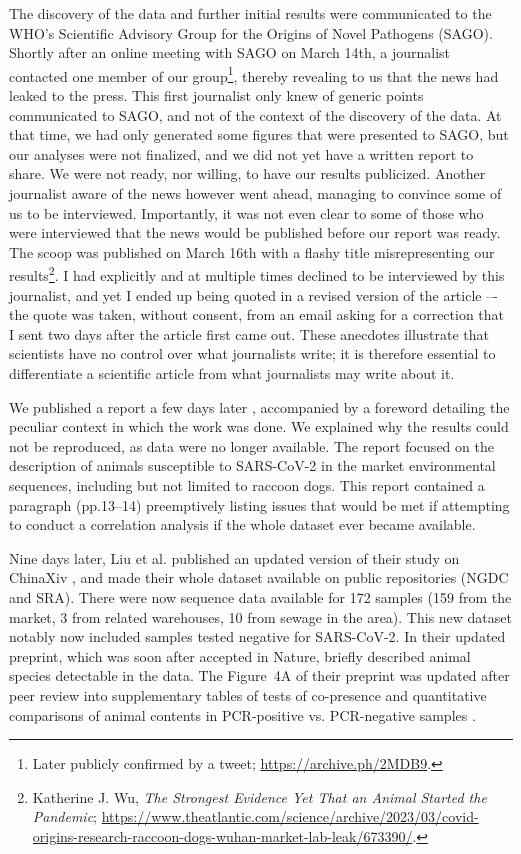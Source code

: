 \documentclass[11pt]{article}
\def \sct {\mbox{SARS-CoV-2}}
\begin{document}
The discovery of the data and further initial results were communicated to the WHO's Scientific Advisory Group for the Origins of Novel Pathogens (SAGO). Shortly after an online meeting with SAGO on March 14th, a journalist contacted one member of our group\footnote{Later publicly confirmed by a tweet; \url{https://archive.ph/2MDB9}.}, thereby revealing to us that the news had leaked to the press. This first journalist only knew of generic points communicated to SAGO, and not of the context of the discovery of the data. At that time, we had only generated some figures that were presented to SAGO, but our analyses were not finalized, and we did not yet have a written report to share. We were not ready, nor willing, to have our results publicized. Another journalist aware of the news however went ahead, managing to convince some of us to be interviewed. Importantly, it was not even clear to some of those who were interviewed that the news would be published before our report was ready. The scoop was published on March 16th with a flashy title misrepresenting our results\footnote{\label{foot:wu}Katherine J. Wu, \textit{The Strongest Evidence Yet That an Animal Started the Pandemic}; \url{https://www.theatlantic.com/science/archive/2023/03/covid-origins-research-raccoon-dogs-wuhan-market-lab-leak/673390/}.\par}. I had explicitly and at multiple times declined to be interviewed by this journalist, and yet I ended up being quoted in a revised version of the article –- the quote was taken, without consent, from an email asking for a correction that I sent two days after the article first came out. These anecdotes illustrate that scientists have no control over what journalists write; it is therefore essential to differentiate a scientific article from what journalists may write about it.

We published a report a few days later \citep{ACC2023Zenodo}, accompanied by a foreword detailing the peculiar context in which the work was done. We explained why the results could not be reproduced, as data were no longer available. The report focused on the description of animals susceptible to \sct{} in the market environmental sequences, including but not limited to raccoon dogs. This report contained a paragraph (pp.13--14) preemptively listing issues that would be met if attempting to conduct a correlation analysis if the whole dataset ever became available.
 
Nine days later, Liu et al. published an updated version of their study on ChinaXiv \citep{Liu2023ChinaXiv}, and made their whole dataset available on public repositories (NGDC and SRA). There were now sequence data available for 172 samples (159 from the market, 3 from related warehouses, 10 from sewage in the area). This new dataset notably now included samples tested negative for \sct{}. In their updated preprint, which was soon after accepted in Nature, \citet{Liu2023Nature} briefly described animal species detectable in the data. The Figure~4A of their preprint was updated after peer review into supplementary tables of tests of co-presence \citep[Supplementary Table 9]{Liu2023Nature} and quantitative comparisons of animal contents in PCR-positive vs. PCR-negative samples \citep[Supplementary Table 7]{Liu2023Nature}. 
\end{document}
